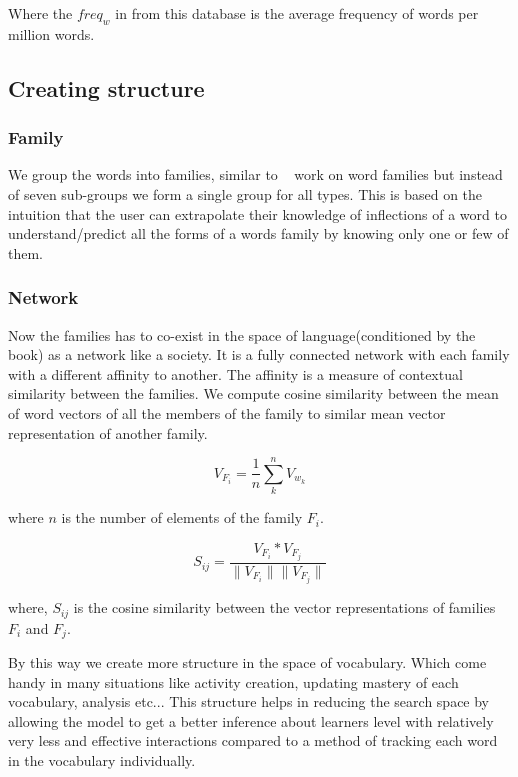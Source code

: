 \documentclass[11pt,a4paper]{article}
\begin{document}
Where the ${freq_w}$ in from this database is the average frequency of words per
million words.

\subsection{Creating structure}

\subsubsection{Family}
We group the words into families, similar to ~\citep{bauer1993word} work on word
families but instead of seven sub-groups we form a single group for all types.
This is based on the intuition that the user can extrapolate their knowledge of
inflections of a word to understand/predict all the forms of a words family
by knowing only one or few of them.

\subsubsection{Network}
Now the families has to co-exist in the space of language(conditioned by the
book) as a network like a society. It is a fully connected network with each
family with a different affinity to another. The affinity is a measure of
contextual similarity between the families. We compute cosine similarity 
between the mean of word vectors of all the members of the family to similar
mean vector representation of another family.

\begin{equation}
  V_{F_i} = \frac{1}{n} \sum_{k}^{n} V_{w_k}
\end{equation}

where ${n}$ is the number of elements of the family ${F_i}$.

\begin{equation}
  S_{ij} = \frac{V_{F_i} * V_{F_j}}{\|V_{F_i}\|  \|V_{F_j}\|}
\end{equation}

where, ${S_{ij}}$ is the cosine similarity between the vector representations of
families ${F_i}$ and ${F_j}$.


By this way we create more structure in the space of vocabulary. Which come
handy in many situations like activity creation, updating mastery of each
vocabulary, analysis etc... This structure helps in reducing the search space
by allowing the model to get a better inference about learners level with
relatively very less and effective interactions compared to a method of
tracking each word in the vocabulary individually.
\end{document}
